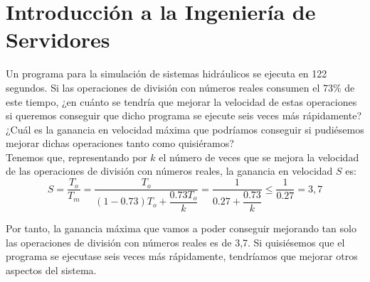 \section{Introducción a la Ingeniería de Servidores}

\begin{ejercicio}
Un programa para la simulación de sistemas hidráulicos se ejecuta en 122 segundos. Si las operaciones de división con números reales consumen el 73\% de este tiempo, ¿en cuánto se tendría que mejorar la velocidad de estas operaciones si queremos conseguir que dicho programa se ejecute seis veces más rápidamente? ¿Cuál es la ganancia en velocidad máxima que podríamos conseguir si pudiésemos mejorar dichas operaciones tanto como quisiéramos?\\

Tenemos que, representando por $k$ el número de veces que se mejora la velocidad de las operaciones de división con números reales, la ganancia en velocidad $S$ es:
\begin{equation*}
    S = \frac{T_o}{T_m} = \dfrac{T_o}{(1-0.73)T_o + \dfrac{0.73T_o}{k}}
    = \dfrac{1}{0.27 + \dfrac{0.73}{k}}\leq \dfrac{1}{0.27} = 3,7
\end{equation*}

Por tanto, la ganancia máxima que vamos a poder conseguir mejorando tan solo las operaciones de división con números reales es de 3,7. Si quisiésemos que el programa se ejecutase seis veces más rápidamente, tendríamos que mejorar otros aspectos del sistema.
\end{ejercicio}

